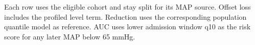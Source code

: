 \begin{table}[!htbp]
\caption{Profiled offset results within MAP source.}
\label{tab:map_source_sensitivity}
\centering
\small
\setlength{\tabcolsep}{4pt}
\par\smallskip
\footnotesize{Each row uses the eligible cohort and stay split for its MAP source. Offset loss includes the profiled level term. Reduction uses the corresponding population quantile model as reference. AUC uses lower admission window q10 as the risk score for any later MAP below 65 mmHg.}
\end{table}

